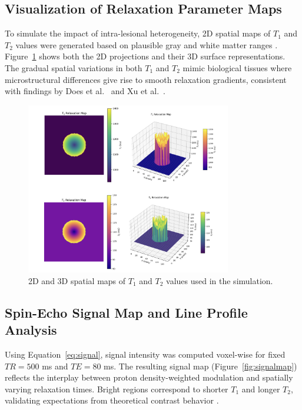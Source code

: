 \documentclass[10pt,a4paper,twoside]{article}
\begin{document}
\begin{enumerate}
\subsection{Visualization of Relaxation Parameter Maps}

To simulate the impact of intra-lesional heterogeneity, 2D spatial maps of \( T_1 \) and \( T_2 \) values were generated based on plausible gray and white matter ranges \cite{stanisz2005, bojorquez2017}. Figure~\ref{fig:t1t2maps} shows both the 2D projections and their 3D surface representations. The gradual spatial variations in both \( T_1 \) and \( T_2 \) mimic biological tissues where microstructural differences give rise to smooth relaxation gradients, consistent with findings by Does et al.\ \cite{does2002} and Xu et al.\ \cite{xu2009}.

\begin{figure}[htbp!]
\centering
\includegraphics[width=0.8\textwidth]{t1t2maps.png}
\caption{2D and 3D spatial maps of \( T_1 \) and \( T_2 \) values used in the simulation.}
\label{fig:t1t2maps}
\end{figure}


\subsection{Spin-Echo Signal Map and Line Profile Analysis}

Using Equation~\eqref{eq:signal}, signal intensity was computed voxel-wise for fixed \( TR = 500 \) ms and \( TE = 80 \) ms. The resulting signal map (Figure~\ref{fig:signalmap}) reflects the interplay between proton density-weighted modulation and spatially varying relaxation times. Bright regions correspond to shorter \( T_1 \) and longer \( T_2 \), validating expectations from theoretical contrast behavior \cite{bernstein2004, brown2014}.


\end{enumerate}
\end{document}
